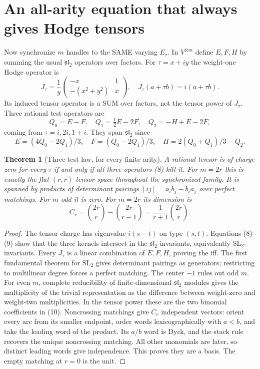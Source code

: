 \documentclass[11pt]{article}
\newtheorem{theorem}{Theorem}
\begin{document}
\section{An all-arity equation that always gives Hodge tensors}
Now synchronize $m$ handles to the SAME varying $E_\tau$. In
$V^{\otimes m}$ define $E,F,H$ by summing the usual $\mathfrak{sl}_2$
operators over factors. For $\tau=x+iy$ the weight-one Hodge operator is
\[
 J_\tau=\frac1y\begin{pmatrix}-x&1\\-(x^2+y^2)&x\end{pmatrix},
 \quad J_\tau(a+\tau b)=i(a+\tau b).
\]
Its induced tensor operator is a SUM over factors, not the tensor power
of $J_\tau$. Three rational test operators are
\[
 Q_0=E-F,\quad Q_1=\tfrac12E-2F,\quad Q_2=-H+E-2F,
 \tag{8}
\]
coming from $\tau=i,2i,1+i$. They span $\mathfrak{sl}_2$ since
\[
 E=(4Q_0-2Q_1)/3,\quad F=(Q_0-2Q_1)/3,
 \quad H=2(Q_0+Q_1)/3-Q_2.\tag{9}
\]
\begin{theorem}[Three-test law, for every finite arity]
A rational tensor is of charge zero for every $\tau$ if and only if
all three operators (8) kill it. For $m=2r$ this is exactly the
flat $(r,r)$ tensor space throughout the synchronized family. It is
spanned by products of determinant pairings
$[ij]=a_i b_j-b_i a_j$ over perfect matchings. For $m$ odd it is zero.
For $m=2r$ its dimension is
\[
 C_r=\binom{2r}{r}-\binom{2r}{r-1}=\frac1{r+1}\binom{2r}{r}.\tag{10}
\]
\end{theorem}
\begin{proof}
The tensor charge has eigenvalue $i(s-t)$ on type $(s,t)$.
Equations (8)--(9) show that the three kernels intersect in the
$\mathfrak{sl}_2$-invariants, equivalently $\mathrm{SL}_2$-invariants.
Every $J_\tau$ is a linear combination of $E,F,H$, proving the iff.
The first fundamental theorem for $\mathrm{SL}_2$ gives determinant
pairings as generators; restricting to multilinear degree forces a
perfect matching. The center $-1$ rules out odd $m$. For even $m$,
complete reducibility of finite-dimensional $\mathfrak{sl}_2$ modules
gives the multiplicity of the trivial representation as the difference
between weight-zero and weight-two multiplicities. In the tensor power
these are the two binomial coefficients in (10).
Noncrossing matchings give $C_r$ independent vectors: orient every arc
from its smaller endpoint, order words lexicographically with $a<b$,
and take the leading word of the product. Its $a/b$ word is Dyck, and
the stack rule recovers the unique noncrossing matching. All other
monomials are later, so distinct leading words give independence.
This proves they are a basis. The empty matching at $r=0$ is the unit.
\end{proof}
\end{document}

